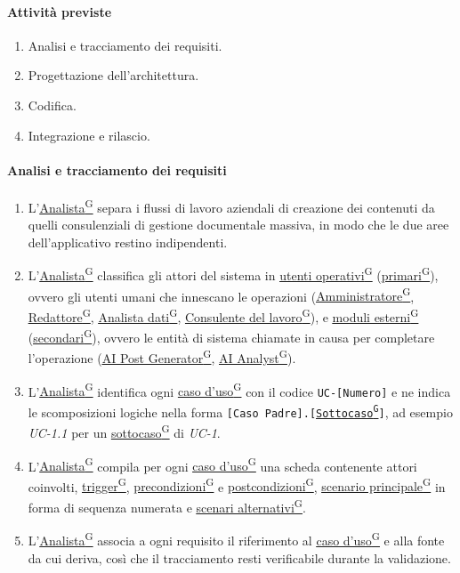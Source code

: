 \documentclass[a4paper,12pt]{article}
\providecommand{\glslink}[2]{\href{https://alittlebyte-19.github.io/Documentazione/glossario.html\#gls-#1}{\underline{#2}\textsuperscript{\scriptsize G}}}
\begin{document}
\paragraph{Attività previste}
\begin{enumerate}
    \item Analisi e tracciamento dei requisiti.
    \item Progettazione dell'architettura.
    \item Codifica.
    \item Integrazione e rilascio.
\end{enumerate}

\paragraph{Analisi e tracciamento dei requisiti}
\begin{enumerate}
    \item L'\glslink{analista}{Analista} separa i flussi di lavoro aziendali di creazione dei contenuti da quelli consulenziali di gestione documentale massiva, in modo che le due aree dell'applicativo restino indipendenti.
    \item L'\glslink{analista}{Analista} classifica gli attori del sistema in \glslink{utente-operativo}{utenti operativi} (\glslink{attore-primario}{primari}), ovvero gli utenti umani che innescano le operazioni (\glslink{amministratore}{Amministratore}, \glslink{redattore}{Redattore}, \glslink{analista-dati}{Analista dati}, \glslink{consulente-del-lavoro-cdl}{Consulente del lavoro}), e \glslink{moduli-esterni}{moduli esterni} (\glslink{attore-secondario}{secondari}), ovvero le entità di sistema chiamate in causa per completare l'operazione (\glslink{ai-post-generator}{AI Post Generator}, \glslink{ai-analyst}{AI Analyst}).
    \item L'\glslink{analista}{Analista} identifica ogni \glslink{caso-d-uso-uc}{caso d'uso} con il codice \texttt{UC-[Numero]} e ne indica le scomposizioni logiche nella forma \texttt{[Caso Padre].[\glslink{sottocaso}{Sottocaso}]}, ad esempio \textit{UC-1.1} per un \glslink{sottocaso}{sottocaso} di \textit{UC-1}.
    \item L'\glslink{analista}{Analista} compila per ogni \glslink{caso-d-uso-uc}{caso d'uso} una scheda contenente attori coinvolti, \glslink{trigger}{trigger}, \glslink{precondizioni}{precondizioni} e \glslink{postcondizioni}{postcondizioni}, \glslink{scenario-principale}{scenario principale} in forma di sequenza numerata e \glslink{scenario-alternativo}{scenari alternativi}.
    \item L'\glslink{analista}{Analista} associa a ogni requisito il riferimento al \glslink{caso-d-uso-uc}{caso d'uso} e alla fonte da cui deriva, così che il tracciamento resti verificabile durante la validazione.
\end{enumerate}
\end{document}
